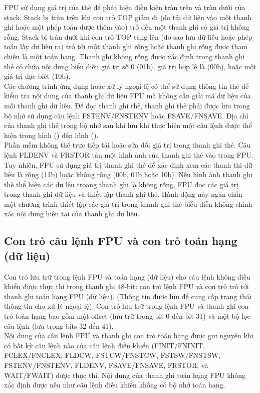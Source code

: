 	FPU sử dụng giá trị của thẻ để phát hiện điều kiện tràn trên và tràn dưới của stack. Stack bị tràn trên khi con trỏ TOP giảm đi (do tải dữ liệu vào một thanh ghi hoặc một phép toán được thêm vào) trỏ đến một thanh ghi có giá trị không rỗng. Stack bị tràn dưới khi con trỏ TOP tăng lên (do sao lưu dữ liêu hoặc phép toán lấy dữ liệu ra) trỏ tới một thanh ghi rỗng hoặc thanh ghi rỗng được tham chiếu là một toán hạng. Thanh ghi không rỗng được xác định trong thanh ghi thẻ có chứa nội dung biểu diễn giá trị số 0 (01b), giá trị hợp lệ là (00b), hoặc một giá trị đặc biêt (10b).\\
	
	Các chương trình ứng dụng hoặc xử lý ngoại lệ có thể sử dụng thông tin thẻ để kiểm tra nội dung của thanh ghi dữ liệu FPU mà không cần giải mã dữ liệu của mỗi thanh ghi dữ liệu. Để đọc thanh ghi thẻ, thanh ghi thẻ phải được lưu trong bộ nhớ sử dụng câu lệnh FSTENV/FNSTENV hoặc FSAVE/FNSAVE.  Địa chỉ của thanh ghi thẻ trong bộ nhớ sau khi lưu khi thực hiện một câu lệnh được thể hiện trong hình () đến hình (). \\
	
	Phần mềm không thể trực tiếp tải hoặc sửa đổi giá trị trong thanh ghi thẻ. Câu lệnh FLDENV và FRSTOR tảu một hình ảnh của thanh ghi thẻ vào trong FPU. Tuy nhiên, FPU sử dụng giá trị thanh ghi thẻ để xác định xem các thanh thi dữ liệu là rỗng (11b) hoặc không rỗng (00b, 01b hoặc 10b). Nếu hình ảnh thanh ghi thẻ thể hiện các dữ lệu troang thanh ghi là không rỗng, FPU đọc các giá trị trong thanh ghi dữ liệu và thiết lập thanh ghi thẻ. Hành động này ngăn chẳn một chương trình thiết lập các giá trị trong thanh ghi thẻ biểu diễn không chính xác nội dung hiện tại của thanh ghi dữ liệu.
	
		\subsection*{Con trỏ câu lệnh FPU và con trỏ toán hạng (dữ liệu)}
	Con trỏ lưu trữ trong lệnh FPU và toán hạng (dữ liệu) cho câu lệnh không điều khiển được thực thi trong thanh ghi 48-bit: con trỏ lệnh FPU và con trỏ trỏ tới thanh ghi toán hạng FPU (dữ liệu). (Thông tin được lưu để cung cấp trạng thái thông tin cho xử lý ngoại lệ). 	Con trỏ lưu trữ trong lệnh FPU và thanh ghi con trỏ toán hạng bao gồm một offset (lưu trữ trong bit 0 đến bit 31) và một bộ lọc câu lệnh (lưu trong bits 32 đến 41).\\
	
	Nội dung của câu lệnh FPU và thanh ghi con trỏ toán hạng được giữ nguyên khi có bất kỳ câu lệnh nào của câu lệnh điều khiển (FINIT/FNINIT, FCLEX/FNCLEX, FLDCW, FSTCW/FNSTCW, FSTSW/FNSTSW, FSTENV/FNSTENV, FLDENV, FSAVE/FNSAVE, FRSTOR, và WAIT/FWAIT) được thực thi. Nội dung của thanh ghi toán hạng FPU không xác định được nếu như câu lệnh điều khiển không có bộ nhớ toán hạng.\\
 	
